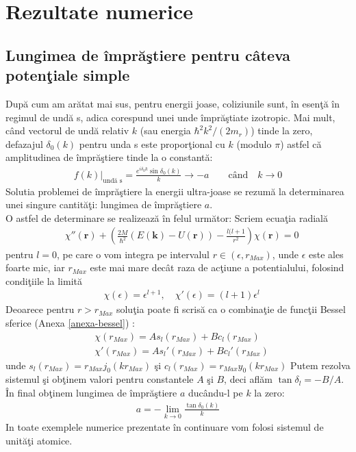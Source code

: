 \chapter{Rezultate numerice}

\section{Lungimea de \^{i}mpr\u{a}\c{s}tiere pentru c\^{a}teva poten\c{t}iale simple }
Dup\u{a} cum am ar\u{a}tat mai sus, pentru energii joase, coliziunile sunt, \^{i}n esen\c{t}\u{a} \^{i}n regimul de und\u{a} s, adica corespund unei unde \^{i}mpr\u{a}\c{s}tiate izotropic. Mai mult, c\^{a}nd vectorul de und\u{a} relativ $k$ (sau energia $\hbar^2k^2/(2m_r)$) tinde la zero, defazajul $\delta_0(k)$ pentru unda s este propor\c{t}ional cu $k$ (modulo $\pi$) astfel c\u{a} amplitudinea de \^{i}mpr\u{a}\c{s}tiere tinde la o constant\u{a}:
\begin{align}
f(k)\bigg\rvert_{\text{und\u{a} s}}=\frac{e^{i\delta_0k}\sin\delta_0(k)}{k}\to -a \qquad \text{c\^{a}nd} \quad k\to 0 
\end{align}
Solutia problemei de \^{i}mpr\u{a}\c{s}tiere la energii ultra-joase se rezum\u{a} la determinarea unei singure cantit\u{a}\c{t}i: lungimea de \^{i}mpr\u{a}\c{s}tiere $a$.\\

O astfel de determinare se realizeaz\u{a} \^{i}n felul urm\u{a}tor: Scriem ecua\c{t}ia radial\u{a} 
\begin{align}
&\chi''({\bm r})+(\frac{2M}{\hbar^2}(E({\bm k})-U({\bm r}))-\frac{l(l+1}{r^2})\chi({\bm r})=0\label{srad}
\end{align}
pentru $l=0$, pe care o vom integra pe intervalul $r\in (\epsilon,r_{Max})$, unde $\epsilon$ este ales foarte mic, iar $r_{Max}$ este mai mare dec\^at raza de ac\c tiune a potentialului, folosind condi\c tiile la limit\u a
\begin{align}
 &\chi(\epsilon)=\epsilon^{l+1},\quad \chi'(\epsilon)=(l+1)\epsilon^l
\end{align}
Deoarece pentru $r>r_{Max}$ solu\c tia poate fi scris\u a ca o combina\c tie de func\c tii Bessel sferice (Anexa \ref{anexa-bessel}) :
 \begin{align}
&\chi(r_{Max})=A s_l(r_{Max}) +B c_l(r_{Max})\label{eq1}\\
&\chi'(r_{Max})=A s_l'(r_{Max}) +B c_l'(r_{Max})\label{eq2}
\end{align}
unde $s_l(r_{Max})=r_{Max}j_0(k r_{Max})$ \c{s}i $c_l(r_{Max})=r_{Max} y_0 (k r_{Max})$
Putem rezolva sistemul \c{s}i ob\c{t}inem valori pentru constantele $A$ \c{s}i $B$, deci afl\u{a}m $\tan\delta_l=-B/A$. \^{I}n final ob\c{t}inem lungimea de \^{i}mpr\u{a}\c{s}tiere $a$ duc\^{a}ndu-l pe $k$ la zero:
\begin{align}
a=-\lim_{k\to 0}\frac{\tan\delta_0(k)}{k}
\end{align} 
In toate exemplele numerice prezentate \^{i}n continuare vom folosi sistemul de unit\u{a}\c{t}i atomice.

